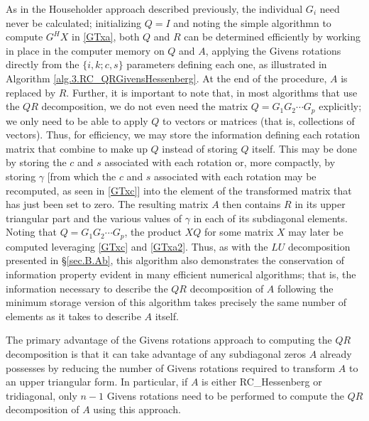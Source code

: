 As in the Householder approach described previously, the individual
$G_{i}$ need never be calculated; initializing $Q=I$ and noting the
simple algorithmn to compute $G^{H}X$ in \eqref{GTxa},
both $Q$ and $R$ can be determined efficiently by working in
place in the computer memory on $Q$ and $A$, applying the Givens
rotations directly from the $\{i,k;c,s\}$ parameters defining each
one, as illustrated in Algorithm \ref{alg.3.RC_QRGivensHessenberg}.
At the end of the procedure, $A$ is replaced by $R$.  Further, it is important to note that, in most algorithms
that use the $QR$ decomposition, we do not even need the matrix
$Q=G_{1}G_{2}\cdots G_{p}$ explicitly; we only need to be able to
apply $Q$ to vectors or matrices (that is, collections of vectors).
Thus, for efficiency, we may store the information defining each
rotation matrix that combine to make up $Q$ instead of storing $Q$ itself.  This may be done by storing the $c$ and $s$ associated with each rotation or,
more compactly, by storing $\gamma$ [from which the $c$ and $s$ associated with each rotation may be recomputed,
as seen in \eqref{GTxc}] into the element of the transformed matrix that has
just been set to zero.  The resulting matrix $A$ then contains $R$ in
its upper triangular part and the various values of $\gamma$ in each
of its subdiagonal elements.  Noting that $Q=G_{1}G_{2}\cdots G_{p}$, the product $XQ$ for some matrix
$X$ may later be computed leveraging \eqref{GTxc} and \eqref{GTxa2}.
Thus, as with the $LU$ decomposition presented in \S \ref{sec.B.Ab},
this algorithm also demonstrates the conservation of information
property evident in many efficient numerical algorithms; that is, the
information necessary to describe the $QR$ decomposition of $A$
following the minimum storage version of this algorithm takes precisely
the same number of elements as it takes to describe $A$ itself.

The primary advantage of the Givens rotations approach to computing
the $QR$ decomposition is that it can take advantage of any subdiagonal zeros $A$ already possesses by reducing the number of Givens
rotations required to transform $A$ to an upper triangular form.  In particular,
if $A$ is either RC_Hessenberg or tridiagonal, only $n-1$ Givens
rotations need to be performed to compute the $QR$ decomposition of
$A$ using this approach.

\enlargethispage{3pt}

\begin{figure*}[t]

\end{figure*}

